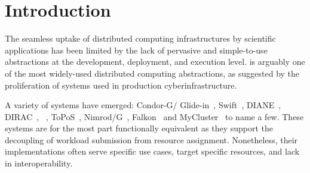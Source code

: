 \documentclass{sig-alternate}
\begin{document}
\begin{abstract}
\end{abstract}

\section{Introduction}
\label{sec:intro}


The seamless uptake of distributed computing infrastructures by scientific
applications has been limited by the lack of pervasive and simple-to-use
abstractions at the development, deployment, and execution level. \pilotjob is
arguably one of the most widely-used distributed computing abstractions, as
suggested by the proliferation of \pilotjob systems used in production
cyberinfrastructure.

A variety of \pilotjob systems have emerged: Condor-G/ Glide-in~\cite{condor-g},
Swift~\cite{Wilde2011}, DIANE~\cite{Moscicki:908910},
DIRAC~\cite{1742-6596-219-6-062049}, \panda~\cite{1742-6596-219-6-062041},
ToPoS~\cite{topos}, Nimrod/G~\cite{10.1109/HPC.2000.846563},
Falkon~\cite{1362680} and
MyCluster~\cite{1652061,mycluster-clade,mycluster-cluster} to name a few. These
systems are for the most part functionally equivalent as they support the
decoupling of workload submission from resource assignment. Nonetheless, their
implementations often serve specific use cases, target specific resources, and
lack in interoperability.
\end{document}
